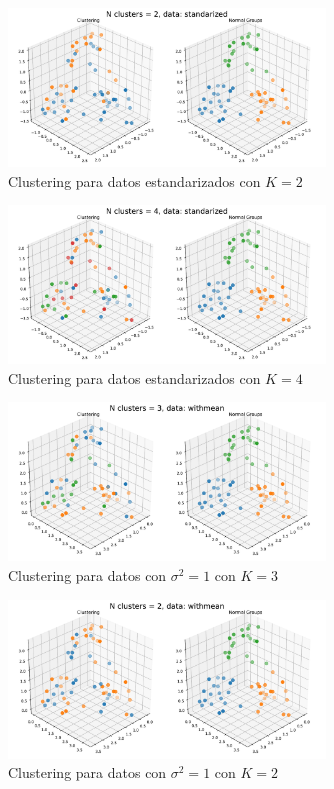 \documentclass[11pt]{article}
\begin{document}
\begin{figure}[H]
    \centering
    \includegraphics[width = 0.75\textwidth]{3-standarized-2.pdf}
    \caption{Clustering para datos estandarizados con $K = 2$}
    \label{3-standarized-2}
\end{figure}
\begin{figure}[H]
    \centering
    \includegraphics[width = 0.75\textwidth]{3-standarized-4.pdf}
    \caption{Clustering para datos estandarizados con $K = 4$}
    \label{3-standarized-4}
\end{figure}
\begin{figure}[H]
    \centering
    \includegraphics[width = 0.75\textwidth]{3-withmean-3.pdf}
    \caption{Clustering para datos con $\sigma^2=1$ con $K = 3$}
    \label{3-withmean-3}
\end{figure}
\begin{figure}[H]
    \centering
    \includegraphics[width = 0.75\textwidth]{3-withmean-2.pdf}
    \caption{Clustering para datos con $\sigma^2=1$ con $K = 2$}
    \label{3-withmean-2}
\end{figure}
\end{document}
